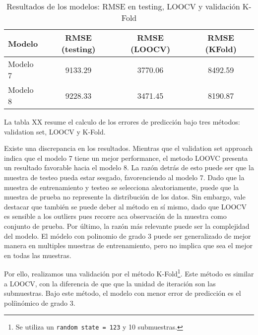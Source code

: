 \documentclass[11pt,oneside]{article}
\newcommand{\code}{\texttt}
\begin{document}
\begin{table}[H]
\centering
\begin{tabular}{lccc}
\hline
\textbf{Modelo} & \textbf{RMSE (testing)} & \textbf{RMSE (LOOCV)} & \textbf{RMSE (KFold)} \\ \hline
Modelo 7        & 9133.29                & 3770.06               & 8492.59               \\
Modelo 8        & 9228.33                & 3471.45               & 8190.87               \\ \hline
\end{tabular}
\caption{Resultados de los modelos: RMSE en testing, LOOCV y validación K-Fold}
\label{tab:resultados_combinados}
\end{table}


La tabla XX resume el calculo de los errores de predicción bajo tres métodos: validation set, LOOCV y K-Fold. 

Existe una discrepancia en los resultados. Mientras que el validation set approach indica que el modelo 7 tiene un mejor performance, el metodo LOOVC presenta un resultado favorable hacia el modelo 8. La razón detrás de esto puede ser que la muestra de testeo pueda estar sesgado, favorenciendo al modelo 7. Dado que la muestra de entrenamiento y testeo se selecciona aleatoriamente, puede que la muestra de prueba no represente la distribución de los datos. Sin embargo, vale destacar que también se puede deber al método en sí mismo, dado que LOOCV es sensible a los outliers pues recorre aca observación de la muestra como conjunto de prueba. Por último, la razón más relevante puede ser la complejidad del modelo. El módelo con polinomio de grado 3 puede ser generalizado de mejor manera en multiples muestras de entrenamiento, pero no implica que sea el mejor en todas las muestras.

Por ello, realizamos una validación por el método K-Fold\footnote{Se utiliza un \code{random state = 123} y 10 submuestras.}. Este método es similar a LOOCV, con la diferencia de que que la unidad de iteración son las submuestras. Bajo este método, el modelo con menor error de predicción es el políinómico de grado 3.


	
	\newpage
	
	
	
	
\end{document}
